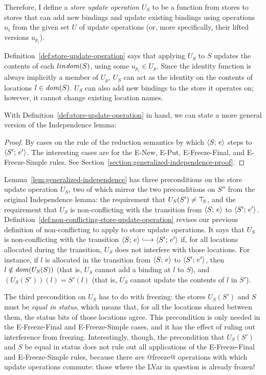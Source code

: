 Therefore, I define a \emph{store update operation} $U_S$ to be a
function from stores to stores that can add new bindings and update
existing bindings using operations $u_i$ from the given set $U$ of
update operations (or, more specifically, their lifted versions
$u_{p_i}$).

\DefStoreUpdateOperation

Definition~\ref{def:store-update-operation} says that applying $U_S$
to $S$ updates the contents of each $l in \mathit{dom}(S)$, using some
$u_{p_i} \in U_p$.  Since the identity function is always implicitly a
member of $U_p$, $U_S$ can act as the identity on the contents of
locations $l \in \mathit{dom}(S)$.  $U_S$ can also add new bindings to the
store it operates on; however, it cannot change existing location
names.

With Definition~\ref{def:store-update-operation} in hand, we can state
a more general version of the Independence lemma:

\LemGeneralizedIndependence
\begin{proof}
  By cases on the rule of the reduction semantics by which
  $\langle S;\, e \rangle$ steps to $\langle S';\, e' \rangle$.  The interesting cases
  are for the {\sc E-New}, {\sc E-Put}, {\sc E-Freeze-Final}, and {\sc
    E-Freeze-Simple} rules.  See
  Section~\ref{section:generalized-independence-proof}.
\end{proof}

Lemma~\ref{lem:generalized-independence} has three preconditions on
the store update operation $U_S$, two of which mirror the two
preconditions on $S''$ from the original Independence lemma: the
requirement that $U_S(S') \neq \top\hspace{-0.85mm}_{S}$, and the requirement that $U_S$
is non-conflicting with the transition from $\langle S;\, e \rangle$ to
$\langle S';\, e' \rangle$.
Definition~\ref{def:non-conflicting-store-update-operation} revises
our previous definition of non-conflicting to apply to store update
operations.  It says that $U_S$ is non-conflicting with the transition
$\config{S}{e} \parstepsto \config{S'}{e'}$ if, for all locations
allocated during the transition, $U_S$ does not interfere with those
locations.  For instance, if $l$ is allocated in the transition from
$\langle S;\, e \rangle$ to $\langle S';\, e' \rangle$, then $l \notin \mathit{dom}(U_S(S))$
(that is, $U_S$ cannot add a binding at $l$ to $S$), and $(U_S(S'))(l)
= S'(l)$ (that is, $U_S$ cannot update the contents of $l$ in $S'$).

\DefNonConflictingStoreUpdateOperation

The third precondition on $U_S$ has to do with freezing: the stores
$U_S(S')$ and $S$ must be \emph{equal in status}, which means that,
for all the locations shared between them, the status bits of those
locations agree.  This precondition is only needed in the {\sc
  E-Freeze-Final} and {\sc E-Freeze-Simple} cases, and it has the
effect of ruling out interference from freezing.  Interestingly,
though, the precondition that $U_S(S')$ and $S$ be equal in status
does not rule out all applications of the {\sc E-Freeze-Final} and
{\sc E-Freeze-Simple} rules, because there \emph{are} @freeze@
operations with which update operations commute: those where the LVar
in question is already frozen!

